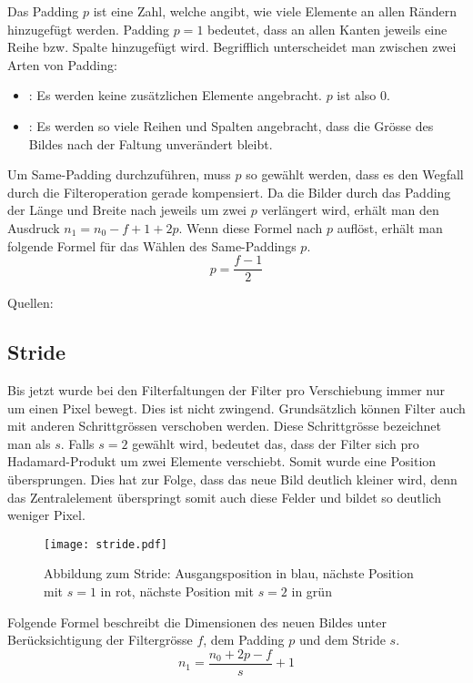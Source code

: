 Das Padding $p$ ist eine Zahl, welche angibt, wie viele Elemente an allen Rändern
hinzugefügt werden. Padding $p = 1$ bedeutet, dass an allen Kanten jeweils eine
Reihe bzw. Spalte hinzugefügt wird.
Begrifflich unterscheidet man zwischen zwei Arten von Padding:
\begin{itemize}
\item{: Es werden keine zusätzlichen Elemente angebracht. $p$ ist also 0.}
\item{: Es werden so viele Reihen und Spalten angebracht, dass
    die Grösse des Bildes nach der Faltung unverändert bleibt.}
\end{itemize}
\para{}
Um Same-Padding durchzuführen, muss $p$ so gewählt werden, dass es den Wegfall durch
die Filteroperation gerade kompensiert. Da die Bilder durch das Padding der Länge und
Breite nach jeweils um zwei $p$ verlängert wird, erhält man den Ausdruck $n_1 =
n_0 - f + 1 + 2p$. Wenn diese Formel nach $p$ auflöst,
erhält man folgende Formel für das Wählen des Same-Paddings $p$.
\\
\begin{equation}
  p = \frac{f-1}{2}
\end{equation}

\para{}
Quellen: \cite{deeplearning.ai:cnn}

\subsection{Stride}
Bis jetzt wurde bei den Filterfaltungen der Filter pro Verschiebung immer nur
um einen Pixel bewegt. Dies ist nicht zwingend. Grundsätzlich können Filter auch
mit anderen Schrittgrössen verschoben werden.
Diese Schrittgrösse bezeichnet
man als  $s$. Falls $s = 2$ gewählt wird, bedeutet das, dass der
Filter sich pro Hadamard-Produkt um zwei Elemente verschiebt. Somit wurde eine
Position übersprungen. Dies hat zur Folge, dass das neue Bild
deutlich kleiner wird, denn das Zentralelement überspringt somit auch
diese Felder und bildet so deutlich weniger Pixel.
\para{}
\begin{figure}[h!]
  \centering
  \texttt{[image: stride.pdf]}
  \caption{Abbildung zum Stride: Ausgangsposition in blau, nächste Position mit
    $s=1$ in rot, nächste Position mit $s=2$ in grün}
\end{figure}
\para{}
Folgende Formel beschreibt die Dimensionen des neuen Bildes unter
Berücksichtigung der Filtergrösse $f$, dem Padding $p$ und dem Stride $s$.
\\
\begin{equation}
  n_1 = \frac{n_0 + 2p - f}{s} + 1
\end{equation}

